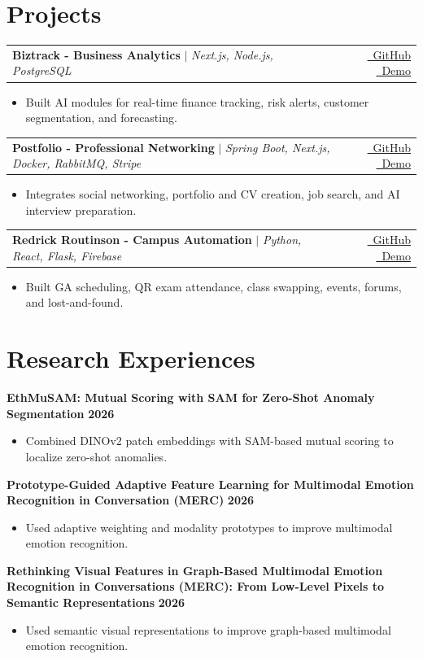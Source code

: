 \documentclass{resume}
\makeatletter
\newcommand{\projectheading}[4]{%
  \Needspace{3\baselineskip}%
  \begin{tabularx}{\linewidth}{@{}X@{\hspace{1em}}r@{}}
    \textbf{#1 - #2} $|$ \emph{#3} & {\small #4}
  \end{tabularx}\vspace{-4pt}
}
\renewenvironment{rSection}[1]{
  \Needspace{3\baselineskip}%
  \section{#1}
  \begin{list}{}{
      \setlength{\leftmargin}{0.2em}
  }
  \item[]
}{
  \end{list}
  \vspace{0pt}
}
\makeatother
\begin{document}
\begin{rSection}{Projects}
\projectheading{Biztrack}{Business Analytics}{Next.js, Node.js, PostgreSQL}{%
  \href{https://github.com/shufanshahi/biztrack}{\faGithub\ GitHub}
  \quad
  \href{https://www.youtube.com/watch?v=STNoXqq8kQM}{\faYoutube\ Demo}%
}
\begin{itemize}
  \item Built AI modules for real-time finance tracking, risk alerts, customer segmentation, and forecasting.
\end{itemize}

\projectheading{Postfolio}{Professional Networking}{Spring Boot, Next.js, Docker, RabbitMQ, Stripe}{%
  \href{https://github.com/shufanshahi/Postfolio}{\faGithub\ GitHub}
  \quad
  \href{https://www.youtube.com/watch?v=U6N-ioqvg9c}{\faYoutube\ Demo}%
}
\begin{itemize}
  \item Integrates social networking, portfolio and CV creation, job search, and AI interview preparation.
\end{itemize}

\projectheading{Redrick Routinson}{Campus Automation}{Python, React, Flask, Firebase}{%
  \href{https://github.com/shufanshahi/RedrickRoutinson}{\faGithub\ GitHub}
  \quad
  \href{https://www.youtube.com/watch?v=Fg-GkZrsIzw}{\faYoutube\ Demo}%
}
\begin{itemize}
  \item Built GA scheduling, QR exam attendance, class swapping, events, forums, and lost-and-found.
\end{itemize}
\end{rSection}

\begin{rSection}{Research Experiences}
\textbf{EthMuSAM: Mutual Scoring with SAM for Zero-Shot Anomaly Segmentation} \hfill \textbf{2026}
\begin{itemize}
  \item Combined DINOv2 patch embeddings with SAM-based mutual scoring to localize zero-shot anomalies.
\end{itemize}
\textbf{Prototype-Guided Adaptive Feature Learning for Multimodal Emotion Recognition in Conversation (MERC)} \hfill \textbf{2026}
\begin{itemize}
  \item Used adaptive weighting and modality prototypes to improve multimodal emotion recognition.
\end{itemize}
\textbf{Rethinking Visual Features in Graph-Based Multimodal Emotion Recognition in Conversations (MERC): From Low-Level Pixels to Semantic Representations} \hfill \textbf{2026}
\begin{itemize}
  \item Used semantic visual representations to improve graph-based multimodal emotion recognition.
\end{itemize}

\end{rSection}
\end{document}
